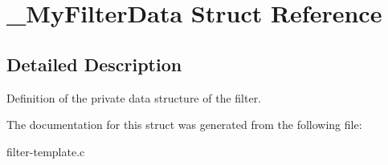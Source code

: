 \section{\_\-MyFilterData Struct Reference}
\label{struct__MyFilterData}


\subsection{Detailed Description}
Definition of the private data structure of the filter. 

The documentation for this struct was generated from the following file:\begin{DoxyCompactItemize}
\item 
filter-\/template.c\end{DoxyCompactItemize}
